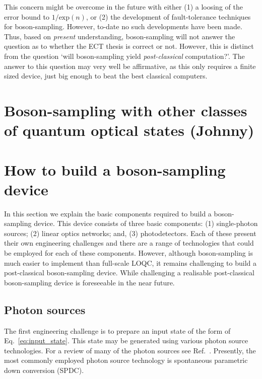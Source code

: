 \documentclass[aps,pra,twocolumn,amsmath,amssymb,nofootinbib,superscriptaddress]{revtex4}
\begin{document}
This concern might be overcome in the future with either (1) a loosing of the error bound to $1/\mathrm{exp}(n)$, or (2) the development of fault-tolerance techniques for boson-sampling. However, to-date no such developments have been made. Thus, based on \emph{present} understanding, boson-sampling will not answer the question as to whether the ECT thesis is correct or not. However, this is distinct from the question `will boson-sampling yield \emph{post-classical} computation?'. The answer to this question may very well be affirmative, as this only requires a finite sized device, just big enough to beat the best classical computers.

\section{Boson-sampling with other classes of quantum optical states (Johnny)}

\section{How to build a boson-sampling device}

In this section we explain the basic components required to build a boson-sampling device. This device consists of three basic components: (1) single-photon sources; (2) linear optics networks; and, (3) photodetectors. Each of these present their own engineering challenges and there are a range of technologies that could be employed for each of these components. However, although boson-sampling is much easier to implement than full-scale LOQC, it remains challenging to build a post-classical boson-sampling device. While challenging a realisable post-classical boson-sampling device is foreseeable in the near future. 

\subsection{Photon sources}

The first engineering challenge is to prepare an input state of the form of Eq.~\ref{eq:input_state}. This state may be generated using various photon source technologies. For a review of many of the photon sources see Ref.~\cite{bib:SourceAndDetectorReview}. Presently, the most commonly employed photon source technology is spontaneous parametric down conversion (SPDC).
\end{document}
